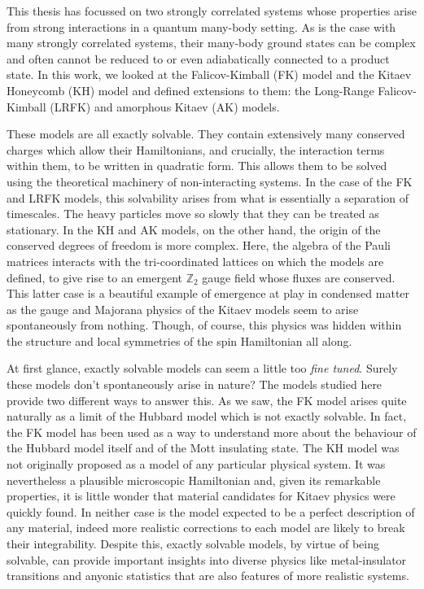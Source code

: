 This thesis has focussed on two strongly correlated systems whose properties arise from strong interactions in a quantum many-body setting. As is the case with many strongly correlated systems, their many-body ground states can be complex and often cannot be reduced to or even adiabatically connected to a product state. In this work, we looked at the Falicov-Kimball (FK) model and the Kitaev Honeycomb (KH) model and defined extensions to them: the Long-Range Falicov-Kimball (LRFK) and amorphous Kitaev (AK) models.

These models are all exactly solvable. They contain extensively many conserved charges which allow their Hamiltonians, and crucially, the interaction terms within them, to be written in quadratic form. This allows them to be solved using the theoretical machinery of non-interacting systems. In the case of the FK and LRFK models, this solvability arises from what is essentially a separation of timescales. The heavy particles move so slowly that they can be treated as stationary. In the KH and AK models, on the other hand, the origin of the conserved degrees of freedom is more complex. Here, the algebra of the Pauli matrices interacts with the tri-coordinated lattices on which the models are defined, to give rise to an emergent \(\mathbb{Z}_2\) gauge field whose fluxes are conserved. This latter case is a beautiful example of emergence at play in condensed matter as the gauge and Majorana physics of the Kitaev models seem to arise spontaneously from nothing. Though, of course, this physics was hidden within the structure and local symmetries of the spin Hamiltonian all along.

At first glance, exactly solvable models can seem a little too \emph{fine tuned}. Surely these models don't spontaneously arise in nature? The models studied here provide two different ways to answer this. As we saw, the FK model arises quite naturally as a limit of the Hubbard model which is not exactly solvable. In fact, the FK model has been used as a way to understand more about the behaviour of the Hubbard model itself and of the Mott insulating state. The KH model was not originally proposed as a model of any particular physical system. It was nevertheless a plausible microscopic Hamiltonian and, given its remarkable properties, it is little wonder that material candidates for Kitaev physics were quickly found. In neither case is the model expected to be a perfect description of any material, indeed more realistic corrections to each model are likely to break their integrability. Despite this, exactly solvable models, by virtue of being solvable, can provide important insights into diverse physics like metal-insulator transitions and anyonic statistics that are also features of more realistic systems.

